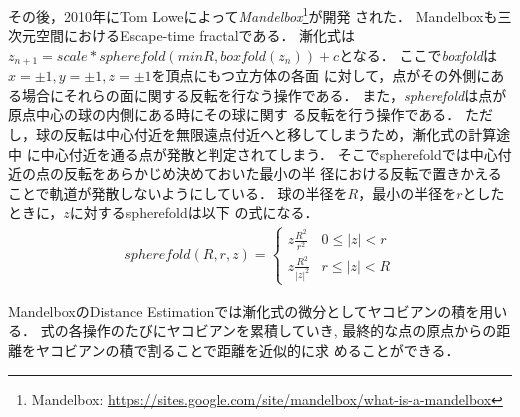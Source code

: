 その後，2010年にTom Loweによって\textit{Mandelbox}\footnote{Mandelbox:
\url{https://sites.google.com/site/mandelbox/what-is-a-mandelbox}}が開発
された．
Mandelboxも三次元空間におけるEscape-time fractalである．
漸化式は$z_{n+1} = scale * spherefold(minR, boxfold(z_n)) + c$となる．
ここで\textit{boxfold}は$x=\pm1, y=\pm1, z=\pm1$を頂点にもつ立方体の各面
に対して，点がその外側にある場合にそれらの面に関する反転を行なう操作である．
また，\textit{spherefold}は点が原点中心の球の内側にある時にその球に関す
る反転を行う操作である．
ただし，球の反転は中心付近を無限遠点付近へと移してしまうため，漸化式の計算途中
に中心付近を通る点が発散と判定されてしまう．
そこでspherefoldでは中心付近の点の反転をあらかじめ決めておいた最小の半
径における反転で置きかえることで軌道が発散しないようにしている．
球の半径を$R$，最小の半径を$r$としたときに，$z$に対するspherefoldは以下
の式になる．
\begin{align*}
 spherefold(R, r, z) = \begin{cases}
                  z \frac{R^2}{r^2} & 0 \le |z| < r \\
                  z \frac{R^2}{|z|^2} & r \le |z| < R
                 \end{cases}
\end{align*}

MandelboxのDistance Estimationでは漸化式の微分としてヤコビアンの積を用いる．
式の各操作のたびにヤコビアンを累積していき,
最終的な点の原点からの距離をヤコビアンの積で割ることで距離を近似的に求
めることができる．

